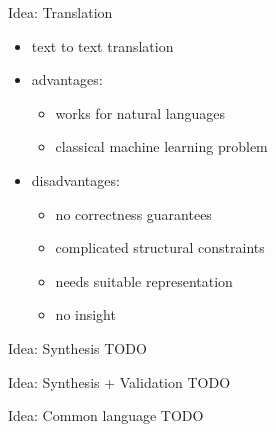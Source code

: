 \documentclass[aspectratio=169, handout]{beamer}
\begin{document}
    \begin{frame}{Idea: Translation}
    \begin{itemize}
        \item text to text translation \pause %
        \item advantages:
            \begin{itemize}
                \item works for natural languages
                \item classical machine learning problem
            \end{itemize} \pause
        \item disadvantages: 
            \begin{itemize}
                \item no correctness guarantees
                \item complicated structural constraints
                \item needs suitable representation
                \item no insight
            \end{itemize}
    \end{itemize}
    \end{frame}
    
    \begin{frame}{Idea: Synthesis}
    \Huge TODO
    \end{frame}
    
    \begin{frame}{Idea: Synthesis + Validation}
    \Huge TODO
    \end{frame}
    
    \begin{frame}{Idea: Common language}
    \Huge TODO
    \end{frame}
    
    
    
    
\end{document}
